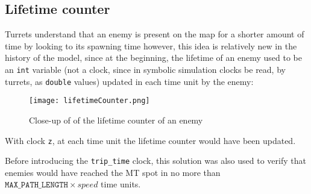 \documentclass[
10pt, %
a4paper, %
oneside, %
headinclude,footinclude, %
BCOR5mm, %
]{scrartcl}
\begin{document}
		\subsection{Lifetime counter}
			Turrets understand that an enemy is present on the map for a shorter amount of time by looking to its spawning time however, this idea is relatively new in the history of the model, since at the beginning, the lifetime of an enemy used to be an \texttt{int} variable (not a clock, since in symbolic simulation clocks be read, by turrets, as \texttt{double} values) updated in each time unit by the enemy:
			
			\begin{figure}[h!]
				\centering
				\texttt{[image: lifetimeCounter.png]}
				\caption{Close-up of of the lifetime counter of an enemy}
			\end{figure}
			With clock \texttt{z}, at each time unit the lifetime counter would have been updated.
			
			Before introducing the \texttt{trip\_time} clock, this solution was also used to verify that enemies would have reached the MT spot in no more than $\texttt{MAX\_PATH\_LENGTH}\times speed$ time units.
	\nocite{1,2,3,4,5,6,7,8}
	\printbibliography
\end{document}

